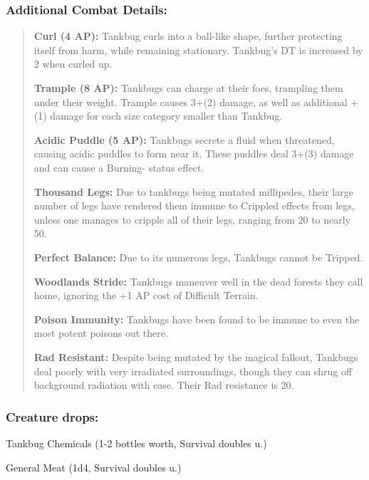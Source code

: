 \documentclass[11pt,a4paper,twocolumn]{book}
\begin{document}
	\subsubsection*{Additional Combat Details:}
	\begin{verse}
		\textbf{Curl (4 AP):} Tankbug curls into a ball-like shape, further protecting itself from harm, while remaining stationary. Tankbug's DT is increased by 2 when curled up.
		
		\textbf{Trample (8 AP):} Tankbugs can charge at their foes, trampling them under their weight. Trample causes 3+(2) damage, as well as additional +(1) damage for each size category smaller than Tankbug.
		
		\textbf{Acidic Puddle (5 AP):} Tankbugs secrete a fluid when threatened, causing acidic puddles to form near it. These puddles deal 3+(3) damage and can cause a Burning- status effect.
		
		\textbf{Thousand Legs:} Due to tankbugs being mutated millipedes, their large number of legs have rendered them immune to Crippled effects from legs, unless one manages to cripple all of their legs, ranging from 20 to nearly 50.
		
		\textbf{Perfect Balance:} Due to its numerous legs, Tankbugs cannot be Tripped.
		
		\textbf{Woodlands Stride:} Tankbugs maneuver well in the dead forests they call home, ignoring the +1 AP cost of Difficult Terrain.
		
		\textbf{Poison Immunity:} Tankbugs have been found to be immune to even the most potent poisons out there.
		
		\textbf{Rad Resistant:} Despite being mutated by the magical fallout, Tankbugs deal poorly with very irradiated surroundings, though they can shrug off background radiation with ease. Their Rad resistance is 20.
	\end{verse}
	
	\subsubsection*{Creature drops:}
	\begin{compactitem}
		\item Tankbug Chemicals (1-2 bottles worth, Survival doubles u.)
		\item General Meat (1d4, Survival doubles u.)
	\end{compactitem}
	
\end{document}
